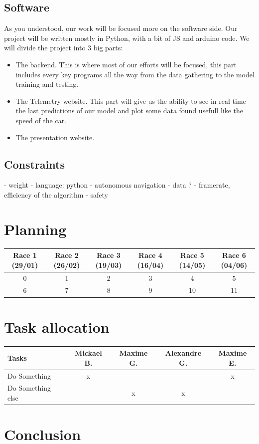 \documentclass[12pt]{article}
\begin{document}
\subsection{Software}
As you understood, our work will be focused more on the software side.
Our project will be written mostly in Python, with a bit of JS and arduino code.
We will divide the project into 3 big parts:
\begin{itemize}
\item The backend. This is where most of our efforts will be focused, this part includes every key programs all the way from the data gathering to the model training and testing.
\item The Telemetry website. This part will give us the ability to see in real time the last predictions of our model and plot some data found usefull like the speed of the car.
\item The presentation website. 
\end{itemize}

 

\subsection{Constraints}
- weight
- language: python
- autonomous navigation
- data ?
- framerate, efficiency of the algorithm
- safety

\section {Planning}
{
\begin{tabular}{|c|c|c|c|c|c|}
  \hline
  Race 1 \tiny{(29/01)} & Race 2 \tiny{(26/02)} & Race 3 \tiny{(19/03)} &  Race 4 \tiny{(16/04)} &  Race 5 \tiny{(14/05)} &  Race 6 \tiny{(04/06)} \\
  \hline
  0 & 1 & 2 & 3 & 4 & 5 \\
  \hline
  6 & 7 & 8 & 9 & 10 & 11 \\
  \hline
\end{tabular}
}

\section {Task allocation}
\begin{tabular}{|l|c|c|c|c|}
  \hline  Tasks & Mickael B. & Maxime G. & Alexandre G. &  Maxime E.\\
  \hline  Do Something & x &  &  & x \\
  \hline  Do Something else &  & x & x & \\
  \hline
\end{tabular}

\section {Conclusion}
\end{document}
